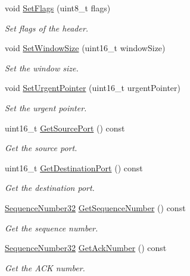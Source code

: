 \begin{DoxyCompactItemize}
void \hyperlink{classns3_1_1TcpHeader_a6574356013e9c62b4543486f640f6be6}{Set\+Flags} (uint8\+\_\+t flags)
\begin{DoxyCompactList}\small\item\em Set flags of the header. \end{DoxyCompactList}\item 
void \hyperlink{classns3_1_1TcpHeader_a659d7fc71c808249fe76fd5b667baf34}{Set\+Window\+Size} (uint16\+\_\+t window\+Size)
\begin{DoxyCompactList}\small\item\em Set the window size. \end{DoxyCompactList}\item 
void \hyperlink{classns3_1_1TcpHeader_a082b4d492dd7fb0b788a4c959f9065cc}{Set\+Urgent\+Pointer} (uint16\+\_\+t urgent\+Pointer)
\begin{DoxyCompactList}\small\item\em Set the urgent pointer. \end{DoxyCompactList}\item 
uint16\+\_\+t \hyperlink{classns3_1_1TcpHeader_a3300d2c712ce38896520f12f185542cb}{Get\+Source\+Port} () const 
\begin{DoxyCompactList}\small\item\em Get the source port. \end{DoxyCompactList}\item 
uint16\+\_\+t \hyperlink{classns3_1_1TcpHeader_ae974488dcfbd68c5b99a731d8fe63771}{Get\+Destination\+Port} () const 
\begin{DoxyCompactList}\small\item\em Get the destination port. \end{DoxyCompactList}\item 
\hyperlink{group__network_gacb2070e4e98d2d5135c9bede58f07a03}{Sequence\+Number32} \hyperlink{classns3_1_1TcpHeader_a1081077eaf9bc64e9af909cebd128ae5}{Get\+Sequence\+Number} () const 
\begin{DoxyCompactList}\small\item\em Get the sequence number. \end{DoxyCompactList}\item 
\hyperlink{group__network_gacb2070e4e98d2d5135c9bede58f07a03}{Sequence\+Number32} \hyperlink{classns3_1_1TcpHeader_a76e832a86b88ffd2f23c2e246b8fa0f3}{Get\+Ack\+Number} () const 
\begin{DoxyCompactList}\small\item\em Get the A\+CK number. \end{DoxyCompactList}\item 

\end{DoxyCompactItemize}
